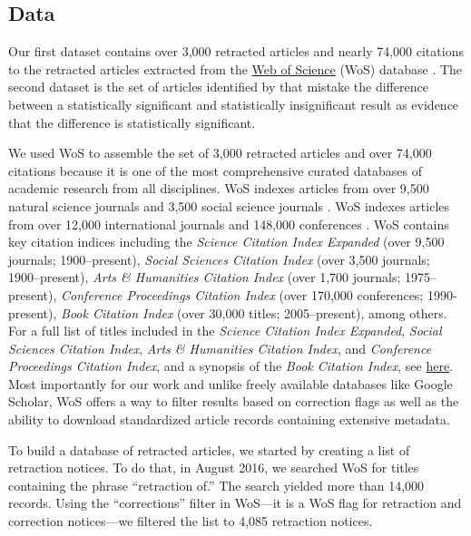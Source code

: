 \documentclass[12pt, letterpaper]{article}
\begin{document}
\subsection{Data}

Our first dataset contains over 3,000 retracted articles and nearly 74,000 citations to the retracted articles extracted from the \href{https://webofknowledge.com}{Web of Science} (WoS) database \citep{clarivate2016web}. The second dataset is the set of articles identified by \citet{nieuwenhuis2011} that mistake the difference between a statistically significant and statistically insignificant result as evidence that the difference is statistically significant.

We used WoS to assemble the set of 3,000 retracted articles and over 74,000 citations because it is one of the most comprehensive curated databases of academic research from all disciplines. WoS indexes articles from over 9,500 natural science journals and 3,500 social science journals \citep{yong2013web}. WoS indexes articles from over 12,000 international journals and 148,000 conferences \citep{yong2013web}. WoS contains key citation indices including the \textit{Science Citation Index Expanded} (over 9,500 journals; 1900--present), \textit{Social Sciences Citation Index} (over 3,500 journals; 1900--present), \textit{Arts \& Humanities Citation Index} (over 1,700 journals; 1975--present), \textit{Conference Proceedings Citation Index} (over 170,000 conferences; 1990-present), \textit{Book Citation Index} (over 30,000 titles; 2005--present), among others. For a full list of titles included in the \textit{Science Citation Index Expanded}, \textit{Social Sciences Citation Index}, \textit{Arts \& Humanities Citation Index}, and \textit{Conference Proceedings Citation Index}, and a synopsis of the \textit{Book Citation Index}, see \href{https://github.com/recite/propagation\_of\_error/tree/master/data/11\_wos/what\_is\_in\_wos/}{here}. Most importantly for our work and unlike freely available databases like Google Scholar, WoS offers a way to filter results based on correction flags as well as the ability to download standardized article records containing extensive metadata.

To build a database of retracted articles, we started by creating a list of retraction notices. To do that, in August 2016, we searched WoS for titles containing the phrase ``retraction of.'' The search yielded more than 14,000 records. Using the ``corrections'' filter in WoS---it is a WoS flag for retraction and correction notices---we filtered the list to 4,085 retraction notices.
\end{document}
